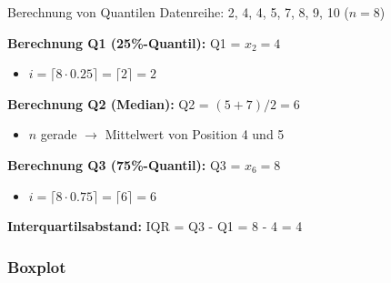 \begin{example2}{Berechnung von Quantilen}
Datenreihe: 2, 4, 4, 5, 7, 8, 9, 10 ($n = 8$)

\textbf{Berechnung Q1 (25\%-Quantil):} Q1 = $x_2 = 4$
\begin{itemize}
    \item $i = \lceil 8 \cdot 0.25 \rceil = \lceil 2 \rceil = 2$
\end{itemize}

\textbf{Berechnung Q2 (Median):} Q2 = $(5 + 7)/2 = 6$
\begin{itemize}
    \item $n$ gerade $\rightarrow$ Mittelwert von Position 4 und 5
\end{itemize}

\textbf{Berechnung Q3 (75\%-Quantil):} Q3 = $x_6 = 8$
\begin{itemize}
    \item $i = \lceil 8 \cdot 0.75 \rceil = \lceil 6 \rceil = 6$
\end{itemize}

\textbf{Interquartilsabstand:} IQR = Q3 - Q1 = 8 - 4 = 4
\end{example2}

\subsubsection{Boxplot}

